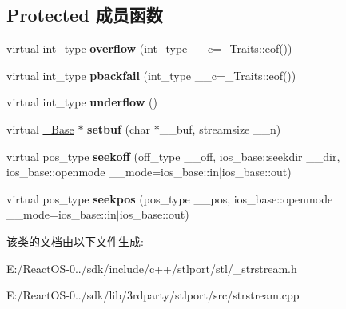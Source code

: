 \subsection*{Protected 成员函数}
\begin{DoxyCompactItemize}
\item 
\mbox{\label{classstrstreambuf_ad1f06e1545acc32b62896b8b0a95e1dc}} 
virtual int\+\_\+type {\bfseries overflow} (int\+\_\+type \+\_\+\+\_\+c=\+\_\+\+Traits\+::eof())
\item 
\mbox{\label{classstrstreambuf_a66e9b14481222e41abeaa61935d9131c}} 
virtual int\+\_\+type {\bfseries pbackfail} (int\+\_\+type \+\_\+\+\_\+c=\+\_\+\+Traits\+::eof())
\item 
\mbox{\label{classstrstreambuf_a120fef763c6d78f93aa0a03caa221e49}} 
virtual int\+\_\+type {\bfseries underflow} ()
\item 
\mbox{\label{classstrstreambuf_a084cd1fe375cff3597bdeb1901e0aa1e}} 
virtual \hyperlink{classbasic__streambuf}{\+\_\+\+Base} $\ast$ {\bfseries setbuf} (char $\ast$\+\_\+\+\_\+buf, streamsize \+\_\+\+\_\+n)
\item 
\mbox{\label{classstrstreambuf_a34580fc2504992ac381212f23e7e85c8}} 
virtual pos\+\_\+type {\bfseries seekoff} (off\+\_\+type \+\_\+\+\_\+off, ios\+\_\+base\+::seekdir \+\_\+\+\_\+dir, ios\+\_\+base\+::openmode \+\_\+\+\_\+mode=ios\+\_\+base\+::in$\vert$ios\+\_\+base\+::out)
\item 
\mbox{\label{classstrstreambuf_a36b10a8320f019904ef7c21e95240090}} 
virtual pos\+\_\+type {\bfseries seekpos} (pos\+\_\+type \+\_\+\+\_\+pos, ios\+\_\+base\+::openmode \+\_\+\+\_\+mode=ios\+\_\+base\+::in$\vert$ios\+\_\+base\+::out)
\end{DoxyCompactItemize}


该类的文档由以下文件生成\+:\begin{DoxyCompactItemize}
\item 
E\+:/\+React\+O\+S-\/0../sdk/include/c++/stlport/stl/\+\_\+strstream.\+h\item 
E\+:/\+React\+O\+S-\/0../sdk/lib/3rdparty/stlport/src/strstream.\+cpp\end{DoxyCompactItemize}
